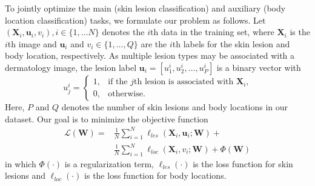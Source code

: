 \documentclass[letterpaper]{article}
\begin{document}
To jointly optimize the main (skin lesion classification) and auxiliary (body
location classification) tasks, we formulate our problem as follows. Let
$(\mathbf{X}_i, \mathbf{u}_i, v_i), i \in \{1, \dots N\}$ denotes the $i$th
data in the training set, where $\mathbf{X}_i$ is
the $i$th image and $\mathbf{u}_i$ and $v_i \in \{1, \dots, Q\}$ are the $i$th
labels for the skin lesion and body location, respectively. As multiple lesion
types may be associated with a dermatology image, the lesion label
$\mathbf{u}_i = [u_1^i, u_2^i, \dots, u_P^i]$ is a binary vector with 
\begin{equation}
  u_j^i = \begin{cases}
    1, & \text{if the $j$th lesion is associated with $\mathbf{X}_i$,} \\
    0, & \text{otherwise.}
  \end{cases}
\end{equation}
Here, $P$ and $Q$ denotes the number of skin lesions and body locations in our
dataset. Our goal is to minimize the objective function
\begin{align}
\mathcal{L} (\mathbf{W}) = 
& \frac{1}{N}\sum_{i=1}^N\ell_{les}(\mathbf{X}_i, \mathbf{u}_i; \mathbf{W}) + \nonumber \\
& \frac{1}{N}\sum_{i=1}^N\ell_{loc}(\mathbf{X}_i, v_i; \mathbf{W}) + \Phi(\mathbf{W})
\end{align}
in which $\Phi(\cdot)$ is a regularization term, $\ell_{les}(\cdot)$ is the loss function
for skin lesions and $\ell_{loc}(\cdot)$ is the loss function for body locations. 
\end{document}
